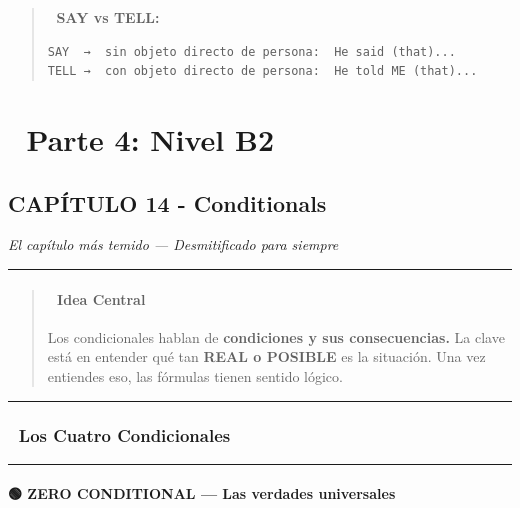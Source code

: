 \documentclass[
  spanish,
  letterpaper,
]{scrbook}
\begin{document}
\begin{quote}
🧠 \textbf{SAY vs TELL:}

\begin{verbatim}
SAY  →  sin objeto directo de persona:  He said (that)...
TELL →  con objeto directo de persona:  He told ME (that)...
\end{verbatim}
\end{quote}

\part{📕 Parte 4: Nivel B2}

\chapter{CAPÍTULO 14 -
Conditionals}\label{capuxedtulo-14---conditionals}

\emph{El capítulo más temido --- Desmitificado para siempre}

\begin{center}\rule{0.5\linewidth}{0.5pt}\end{center}

\begin{quote}
\subsection{🎯 Idea Central}\label{idea-central-12}

Los condicionales hablan de \textbf{condiciones y sus consecuencias.} La
clave está en entender qué tan \textbf{REAL o POSIBLE} es la situación.
Una vez entiendes eso, las fórmulas tienen sentido lógico.
\end{quote}

\begin{center}\rule{0.5\linewidth}{0.5pt}\end{center}

\section{📐 Los Cuatro Condicionales}\label{los-cuatro-condicionales}

\begin{center}\rule{0.5\linewidth}{0.5pt}\end{center}

\subsection{🟢 ZERO CONDITIONAL --- Las verdades
universales}\label{zero-conditional-las-verdades-universales}
\end{document}
